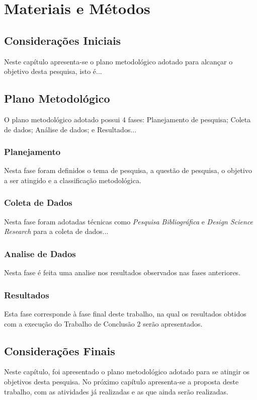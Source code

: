 \chapter{Materiais e Métodos}
\label{ch:metodologia}
\section{Considerações Iniciais}

Neste capítulo apresenta-se o plano metodológico adotado para alcançar o objetivo desta pesquisa, isto é...

\section{Plano Metodológico}

O plano metodológico adotado possui 4 fases: Planejamento de pesquisa; Coleta de dados; Análise de dados; e Resultados...


\subsection{Planejamento} Nesta fase foram definidos o tema de pesquisa, a questão de pesquisa, o objetivo a ser atingido e a classificação metodológica.

\subsection{Coleta de Dados} Nesta fase foram adotadas técnicas como \textit{Pesquisa Bibliográfica} e \textit{Design Science Research} para a coleta de dados...

\subsection{Analise de Dados} Nesta fase é feita uma analise nos resultados observados nas fases anteriores.

\subsection{Resultados} Esta fase corresponde à fase final deste trabalho, na qual os resultados obtidos com a execução do Trabalho de Conclusão 2 serão apresentados. 

\section{Considerações Finais}

Neste capítulo, foi apresentado o plano metodológico adotado para se atingir os objetivos desta pesquisa. No próximo capítulo apresenta-se a proposta deste trabalho, com as atividades já realizadas e as que ainda serão realizadas. 